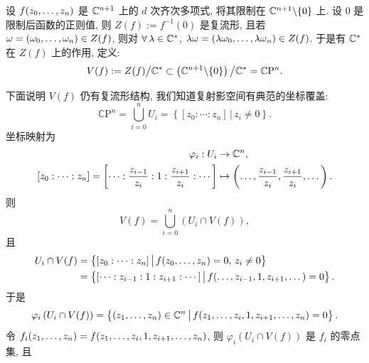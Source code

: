         \begin{example}[齐次多项式零点定义的射影空间的子集]
            设 $f({z}_{0},\dots,{z}_{n})$ 是 $\mathbb{C}^{n+1}$ 上的 $d$ 次齐次多项式, 将其限制在 $\mathbb{C}^{n+1}\backslash\{0\}$ 上.
            设 $0$ 是限制后函数的正则值, 则 $Z(f):=f^{-1}(0)$ 是复流形, 且若 $\omega = ({\omega}_{0},\dots,{\omega}_{n})\in Z(f)$, 
            则对 $\forall\,\lambda\in\mathbb{C}^{*}$, $\lambda\omega = ({\lambda\omega}_{0},\dots,{\lambda\omega}_{n})\in Z(f)$.
             于是有 $\mathbb{C}^*$ 在 $Z(f)$ 上的作用, 定义:
            \begin{equation*}
                V(f):=Z(f)\big/ \mathbb{C}^*\subset\left(\mathbb{C}^{n+1}\backslash\{0\}\right)\big/\mathbb{C}^* = \mathbb{C}\mathrm{P}^n.
            \end{equation*}
            
            下面说明 $V(f)$ 仍有复流形结构, 我们知道复射影空间有典范的坐标覆盖: 
            \begin{equation*}
                \mathbb{C}\mathrm{P}^n = \bigcup_{i=0}^{n}U_i = \left\{[z_0:\cdots:z_n]\,\big|\,z_i\neq0\right\}.
            \end{equation*}
            坐标映射为
            \begin{align*}
                \varphi_i:U_i&\rightarrow\mathbb{C}^n, \\
                [z_0:\cdots:z_n] = \left[\cdots:\frac{z_{i-1}}{z_i}:1:\frac{z_{i+1}}{z_i}:\cdots\right]&\mapsto\left(\dots,\frac{z_{i-1}}{z_i},\frac{z_{i+1}}{z_i},\dots\right).
            \end{align*}
            则
            \begin{equation*}
                V(f) = \bigcup_{i=0}^{n}\left(U_i\cap V(f)\right),
            \end{equation*}
            且 
            \begin{align*}
                U_i\cap V(f) &= \left\{[z_0:\cdots:z_n]\,\big|\,f({z}_{0},\dots,{z}_{n}) = 0,\,z_i\neq0\right\} \\
                & = \left\{[\cdots:z_{i-1}:1:z_{i+1}:\cdots]\,\big|\,f(\dots,z_{i-1},1,z_{i+1},\dots) = 0\right\}.
            \end{align*}
            于是
            \begin{align*}
                \varphi_i\left(U_i\cap V(f)\right) = \left\{({z}_{1},\dots,{z}_{n})\in\mathbb{C}^n\,\big|\,f(z_1,\dots,z_i,1,z_{i+1},\dots,z_n)=0\right\}. \\
            \end{align*}
            令 $f_i({z}_{1},\dots,{z}_{n}) = f(z_1,\dots,z_i,1,z_{i+1},\dots,z_n)$, 则 $\varphi_i\left(U_i\cap V(f)\right)$ 是 $f_i$ 的零点集, 且

\end{example}
